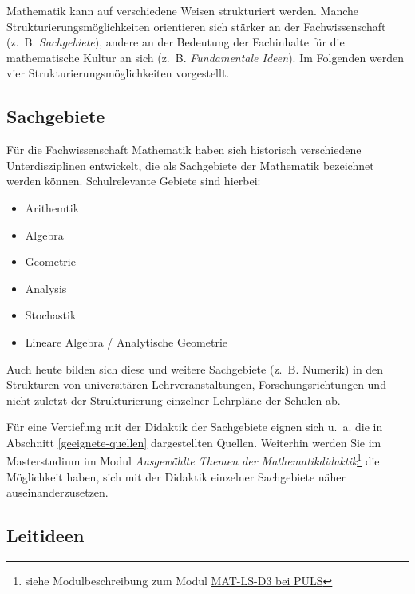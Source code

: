\documentclass[
]{scrbook}
\providecommand{\tightlist}{%
  \setlength{\itemsep}{0pt}\setlength{\parskip}{0pt}}
\theoremstyle{definition}
\theoremstyle{definition}
\theoremstyle{definition}
\theoremstyle{definition}
\theoremstyle{remark}
\begin{document}
Mathematik kann auf verschiedene Weisen strukturiert werden. Manche Strukturierungsmöglichkeiten orientieren sich stärker an der Fachwissenschaft (z.~B. \emph{Sachgebiete}), andere an der Bedeutung der Fachinhalte für die mathematische Kultur an sich (z.~B. \emph{Fundamentale Ideen}). Im Folgenden werden vier Strukturierungsmöglichkeiten vorgestellt.

\subsection{Sachgebiete}\label{sachgebiete}

Für die Fachwissenschaft Mathematik haben sich historisch verschiedene Unterdisziplinen entwickelt, die als Sachgebiete der Mathematik bezeichnet werden können. Schulrelevante Gebiete sind hierbei:

\begin{itemize}
\tightlist
\item
  Arithemtik
\item
  Algebra
\item
  Geometrie
\item
  Analysis
\item
  Stochastik
\item
  Lineare Algebra / Analytische Geometrie
\end{itemize}

Auch heute bilden sich diese und weitere Sachgebiete (z.~B. Numerik) in den Strukturen von universitären Lehrveranstaltungen, Forschungsrichtungen und nicht zuletzt der Strukturierung einzelner Lehrpläne der Schulen ab.

Für eine Vertiefung mit der Didaktik der Sachgebiete eignen sich u.~a. die in Abschnitt \ref{geeignete-quellen} dargestellten Quellen. Weiterhin werden Sie im Masterstudium im Modul \emph{Ausgewählte Themen der Mathematikdidaktik}\footnote{siehe Modulbeschreibung zum Modul \href{https://puls.uni-potsdam.de/qisserver/rds?state=verpublish&status=init&vmfile=no&moduleCall=modulansicht&publishConfFile=modulverwaltung&publishSubDir=up/modulbearbeiter&&modul.modul_id=3186&menuid=&topitem=Modulbeschreibung&subitem=}{MAT-LS-D3 bei PULS}} die Möglichkeit haben, sich mit der Didaktik einzelner Sachgebiete näher auseinanderzusetzen.

\subsection{Leitideen}\label{leitideen}
\end{document}
